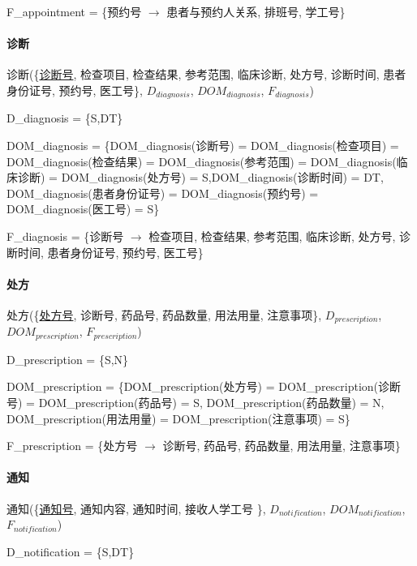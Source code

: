 \documentclass{article}
\begin{document}
F\_appointment = \{预约号 $\rightarrow$ 患者与预约人关系, 排班号, 学工号\}

\paragraph{诊断}

诊断(\{\underline{诊断号}, 检查项目, 检查结果, 参考范围, 临床诊断, 处方号, 诊断时间, 患者身份证号, 预约号, 医工号\}, $D_{diagnosis}$, $DOM_{diagnosis}$, $F_{diagnosis}$)

D\_diagnosis = \{S,DT\}

DOM\_diagnosis = \{DOM\_diagnosis(诊断号) = DOM\_diagnosis(检查项目) = DOM\_diagnosis(检查结果) = DOM\_diagnosis(参考范围) = DOM\_diagnosis(临床诊断) = DOM\_diagnosis(处方号) = S,\newline DOM\_diagnosis(诊断时间) = DT, DOM\_diagnosis(患者身份证号) = DOM\_diagnosis(预约号) = \newline DOM\_diagnosis(医工号) = S\}

F\_diagnosis = \{诊断号 $\rightarrow$ 检查项目, 检查结果, 参考范围, 临床诊断, 处方号, 诊断时间, 患者身份证号, 预约号, 医工号\}

\paragraph{处方}

处方(\{\underline{处方号}, 诊断号, 药品号, 药品数量, 用法用量, 注意事项\}, $D_{prescription}$, $DOM_{prescription}$, $F_{prescription}$)

D\_prescription = \{S,N\}

DOM\_prescription = \{DOM\_prescription(处方号) = DOM\_prescription(诊断号) = \newline DOM\_prescription(药品号) = S, DOM\_prescription(药品数量) = N, \newline DOM\_prescription(用法用量) = DOM\_prescription(注意事项) = S\}

F\_prescription = \{处方号 $\rightarrow$ 诊断号, 药品号, 药品数量, 用法用量, 注意事项\}

\paragraph{通知}

通知(\{\underline{通知号}, 通知内容, 通知时间, 接收人学工号 \}, $D_{notification}$, \newline $DOM_{notification}$, $F_{notification}$)

D\_notification = \{S,DT\}
\end{document}
